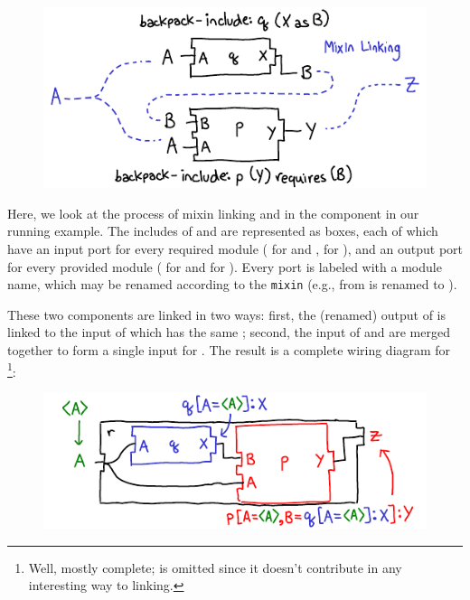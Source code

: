 \begin{figure}[H]
\center\includegraphics{diagrams/mixin-diagram.pdf}
\end{figure}

\noindent
Here, we look at the process of mixin linking  and  in
the component  in our running example.
The includes of  and  are represented as boxes, each of
which have an input port for every required module ( for 
and ,  for ), and an output
port for every provided module ( for  and 
for ).  Every port is labeled with a module name, which may
be renamed according to the \texttt{mixin} (e.g.,  from 
is renamed to ).

These two components are linked in two ways: first, the (renamed) output
of  is linked to the input of  which has the same
; second, the input  of 
and  are merged together to form a single input for .
The result is a complete wiring diagram for \footnote{Well, mostly
complete;  is omitted since it doesn't contribute in any
interesting way to linking.}:

\begin{figure}[H]
\center\includegraphics{diagrams/uid-diagram.pdf}
\end{figure}


